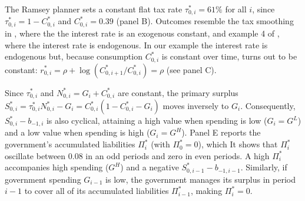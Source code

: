 \documentclass[12pt]{article}
\newcommand{\NW}[1]{{\textcolor{blue}{#1}}}
\begin{document}
The Ramsey planner  sets a constant  flat tax rate  $\tau _{0,i}^\ast =61\%$ for all $i$, since $\tau _{0,i}^\ast = 1 - C_{0,i}^\ast$ and $C_{0,i}^\ast=0.39$ (panel B). Outcomes resemble the tax smoothing   in  \citet{barro1979determination}, where the   %
the interest rate is an exogenous constant, and example 4 of  \citet[sec.~3]{LucasStokey1983} , where the interest rate is   endogenous. %
In our example  the  interest rate is endogenous but, because    consumption $C_{0,i}^\ast$ is constant over time,  turns out to be constant: $r_{0,i}^\ast=\rho + \log({C}_{0,i+1}^\ast/{C}_{0,i}^\ast) = \rho$  (see panel C). 

Since  $\tau_{0,i}^\ast$ and $N_{0,i}^\ast = G_i + C_{0,i}^\ast$  are constant, the primary surplus $S_{0,i}^\ast =\tau_{0,i}^\ast N_{0,i}^\ast - G_i  = C_{0, i}^*\left(1-C_{0, i}^*-G_i \right)$ moves inversely to  $G_i $. Consequently,  $S_{0,i}^\ast - b_{-1, i}$ is also cyclical, attaining a high value when spending  is low ($G_i=G^L$) and a low value when spending  is high ($G_i=G^H$). %
Panel E reports the  government's accumulated  liabilities %
$\Pi_i^\ast$  (with $\Pi_0^\ast=0$), which  It shows that   $\Pi_i^\ast$ 
oscillate between  0.08 in an odd periods  and zero  in even periods.  A high $\Pi_i^\ast$  accompanies high spending ($G^H$) and a negative $S_{0,i-1}^\ast - b_{-1, i-1}$.
 Similarly, if government  spending   $G_{i-1}$ is low, the government manages its surplus in period $i-1$ to cover all of  its accumulated liabilities $\Pi_{i-1}^\ast$, making  $\Pi_i^\ast=0$. %

\end{document}
